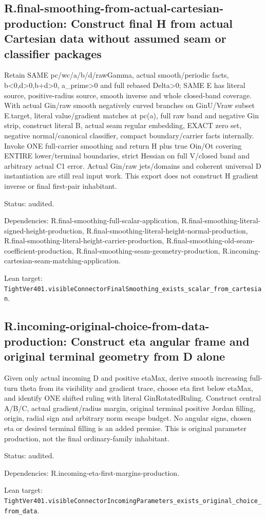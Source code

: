 \documentclass{article}
\begin{document}
\subsection*{R.final-smoothing-from-actual-cartesian-production: Construct final H from actual Cartesian data without assumed seam or classifier packages}
Retain SAME pc/wc/a/b/d/rawGamma, actual smooth/periodic facts, b<0,d>0,b+d>0, a\_prime>0 and full rebased Delta>0; SAME E has literal source, positive-radius source, smooth inverse and whole closed-band coverage. With actual Gin/raw smooth negatively curved branches on GinU/Vraw subset E.target, literal value/gradient matches at pc(a), full raw band and negative Gin strip, construct literal B, actual seam regular embedding, EXACT zero set, negative normal/canonical classifier, compact boundary/carrier facts internally. Invoke ONE full-carrier smoothing and return H plus true Oin/Ot covering ENTIRE lower/terminal boundaries, strict Hessian on full V/closed band and arbitrary actual C1 error. Actual Gin/raw jets/domains and coherent universal D instantiation are still real input work. This export does not construct H gradient inverse or final first-pair inhabitant.
\par Status: audited.
\par Dependencies: R.final-smoothing-full-scalar-application, R.final-smoothing-literal-signed-height-production, R.final-smoothing-literal-height-normal-production, R.final-smoothing-literal-height-carrier-production, R.final-smoothing-old-seam-coefficient-production, R.final-smoothing-seam-geometry-production, R.incoming-cartesian-seam-matching-application.
\par Lean target: \texttt{TightVer401.visibleConnectorFinalSmoothing\_exists\_scalar\_from\_cartesian}.
\subsection*{R.incoming-original-choice-from-data-production: Construct eta angular frame and original terminal geometry from D alone}
Given only actual incoming D and positive etaMax, derive smooth increasing full-turn theta from its visibility and gradient trace, choose eta first below etaMax, and identify ONE shifted ruling with literal GinRotatedRuling. Construct central A/B/C, actual gradient/radius margin, original terminal positive Jordan filling, origin, radial sign and arbitrary norm escape budget. No angular signs, chosen eta or desired terminal filling is an added premise. This is original parameter production, not the final ordinary-family inhabitant.
\par Status: audited.
\par Dependencies: R.incoming-eta-first-margins-production.
\par Lean target: \texttt{TightVer401.visibleConnectorIncomingParameters\_exists\_original\_choice\_from\_data}.
\end{document}
